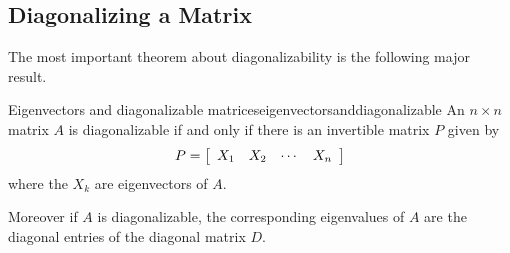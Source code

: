 \subsection{Diagonalizing a Matrix}

The most important theorem about diagonalizability is the following major result.

\begin{theorem}{Eigenvectors and diagonalizable matrices}{eigenvectorsanddiagonalizable}
An $n\times n$ matrix $A$ is diagonalizable if and only if there is an
invertible matrix $P$ given by 
\begin{equation*}
P=\left[
\begin{array}{cccc}
X_{1} & X_{2} & \cdots & X_{n}
\end{array}
\right]
\end{equation*}
where the $X_{k}$ are eigenvectors of $A$. 

Moreover if $A$ is diagonalizable, the corresponding eigenvalues of $A$ are the
diagonal entries of the diagonal matrix $D$.
\end{theorem}

